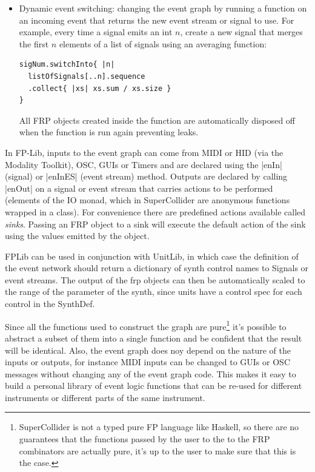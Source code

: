 \documentclass{article}
\begin{document}
\begin{itemize}
\begin{Verbatim}
\end{Verbatim}
\item Dynamic event switching: changing the event graph by running a function on an incoming event that returns the new event stream or signal to use. For example, every time a signal emits an int $n$, create a new signal that merges the first $n$ elements of a list of signals using an averaging function: 
\begin{Verbatim}
sigNum.switchInto{ |n|
  listOfSignals[..n].sequence
  .collect{ |xs| xs.sum / xs.size }
}
\end{Verbatim}
All FRP objects created inside the function are automatically disposed off when the function is run again preventing leaks.
\end{itemize}

In FP-Lib, inputs to the event graph can come from MIDI or HID (via the
Modality Toolkit), OSC, GUIs or Timers and are declared using  the |enIn| (signal) or |enInES| (event stream) method. Outputs are declared by calling |enOut| on a signal or event stream that carries actions to be performed (elements of the IO monad, which in SuperCollider are anonymous functions wrapped in a class). For convenience there are predefined actions available called \textit{sinks}. Passing an FRP object to a sink will execute the default action of the sink using the values emitted by the object.

FPLib can be used in conjunction with UnitLib, in which case the definition of the event network should return a dictionary of synth control names to Signals or event streams. The output of the frp objects can then be automatically scaled to the range of the parameter of the synth, since units have a control spec for each control in the SynthDef.

Since all the functions used to construct the graph are pure\footnote{SuperCollider is not a typed pure FP language like Haskell, so there are no guarantees that the functions passed by the user to the to the FRP combinators are actually pure, it's up to the user to make sure that this is the case.} it's possible to abstract a subset of them into a single function and be confident that the result will be identical. Also, the event graph does noy depend on the nature of the inputs or outputs, for instance MIDI inputs can be changed to GUIs or OSC messages without changing any of the event graph code. This makes it easy to build a personal library of event logic functions that can be re-used for different instruments or different parts of the same instrument.
\end{document}
